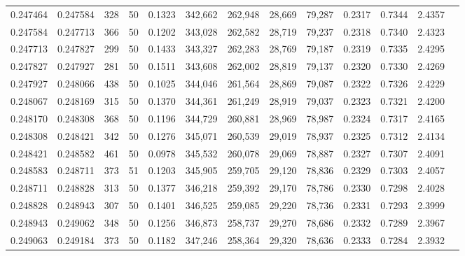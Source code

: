 \begin{tabular}{rrrrrrrrrrrrr}
0.247464 & 0.247584 &   328 &  50 &                                     0.1323 & 342,662 & 262,948 &  28,669 &  79,287 & 0.2317 & 0.7344 & 2.4357 \\
0.247584 & 0.247713 &   366 &  50 &                                     0.1202 & 343,028 & 262,582 &  28,719 &  79,237 & 0.2318 & 0.7340 & 2.4323 \\
0.247713 & 0.247827 &   299 &  50 &                                     0.1433 & 343,327 & 262,283 &  28,769 &  79,187 & 0.2319 & 0.7335 & 2.4295 \\
0.247827 & 0.247927 &   281 &  50 &                                     0.1511 & 343,608 & 262,002 &  28,819 &  79,137 & 0.2320 & 0.7330 & 2.4269 \\
0.247927 & 0.248066 &   438 &  50 &                                     0.1025 & 344,046 & 261,564 &  28,869 &  79,087 & 0.2322 & 0.7326 & 2.4229 \\
0.248067 & 0.248169 &   315 &  50 &                                     0.1370 & 344,361 & 261,249 &  28,919 &  79,037 & 0.2323 & 0.7321 & 2.4200 \\
0.248170 & 0.248308 &   368 &  50 &                                     0.1196 & 344,729 & 260,881 &  28,969 &  78,987 & 0.2324 & 0.7317 & 2.4165 \\
0.248308 & 0.248421 &   342 &  50 &                                     0.1276 & 345,071 & 260,539 &  29,019 &  78,937 & 0.2325 & 0.7312 & 2.4134 \\
0.248421 & 0.248582 &   461 &  50 &                                     0.0978 & 345,532 & 260,078 &  29,069 &  78,887 & 0.2327 & 0.7307 & 2.4091 \\
0.248583 & 0.248711 &   373 &  51 &                                     0.1203 & 345,905 & 259,705 &  29,120 &  78,836 & 0.2329 & 0.7303 & 2.4057 \\
0.248711 & 0.248828 &   313 &  50 &                                     0.1377 & 346,218 & 259,392 &  29,170 &  78,786 & 0.2330 & 0.7298 & 2.4028 \\
0.248828 & 0.248943 &   307 &  50 &                                     0.1401 & 346,525 & 259,085 &  29,220 &  78,736 & 0.2331 & 0.7293 & 2.3999 \\
0.248943 & 0.249062 &   348 &  50 &                                     0.1256 & 346,873 & 258,737 &  29,270 &  78,686 & 0.2332 & 0.7289 & 2.3967 \\
0.249063 & 0.249184 &   373 &  50 &                                     0.1182 & 347,246 & 258,364 &  29,320 &  78,636 & 0.2333 & 0.7284 & 2.3932 \\

\end{tabular}
